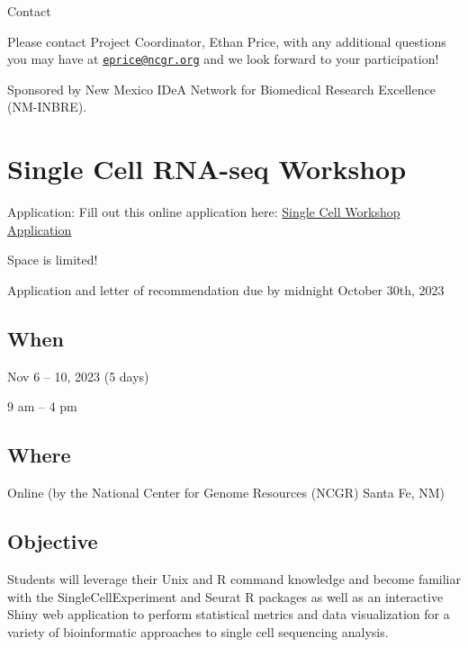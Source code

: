 \documentclass[
]{book}
\begin{document}
Contact

Please contact Project Coordinator, Ethan Price, with any additional questions you may have at \href{mailto:eprice@ncgr.org}{\nolinkurl{eprice@ncgr.org}} and we look forward to your participation!

Sponsored by New Mexico IDeA Network for Biomedical Research Excellence (NM-INBRE).

\hypertarget{single-cell-rna-seq-workshop}{%
\chapter*{Single Cell RNA-seq Workshop}\label{single-cell-rna-seq-workshop}}

Application: Fill out this online application here: \href{https://docs.google.com/forms/d/e/1FAIpQLSfPdh4grpQd94_-kRvZ-NCZbd4RY2W7A31wnqkzwhKTdYZuxg/viewform}{Single Cell Workshop Application}

Space is limited!

Application and letter of recommendation due by midnight October 30th, 2023

\hypertarget{when-2}{%
\section*{When}\label{when-2}}

Nov 6 -- 10, 2023 (5 days)

9 am -- 4 pm

\hypertarget{where-1}{%
\section*{Where}\label{where-1}}

Online (by the National Center for Genome Resources (NCGR) Santa Fe, NM)

\hypertarget{objective-1}{%
\section*{Objective}\label{objective-1}}

Students will leverage their Unix and R command knowledge and become familiar with the SingleCellExperiment and Seurat R packages as well as an interactive Shiny web application to perform statistical metrics and data visualization for a variety of bioinformatic approaches to single cell sequencing analysis.
\end{document}
